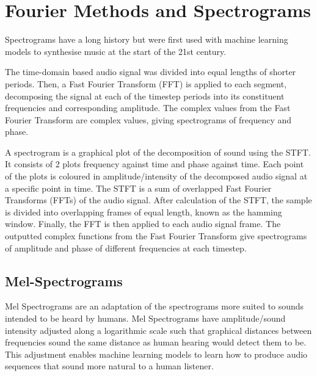 \section{Fourier Methods and Spectrograms}
\label{sec:fourier_methods_and_spectrograms}

Spectrograms have a long history but were first used with machine learning models to synthesise music at the start of the 21st century\cite{NoteOnsetDetection}.

The time-domain based audio signal was divided into equal lengths of shorter periods. Then, a Fast Fourier Transform (FFT) is applied to each segment, decomposing the signal at each of the timestep periods into its constituent frequencies and corresponding amplitude. The complex values from the Fast Fourier Transform are complex values, giving spectrograms of frequency and phase.

A spectrogram is a graphical plot of the decomposition of sound using the \acrfull{STFT}. It consists of 2 plots frequency against time and phase against time. Each point of the plots is coloured in amplitude/intensity of the decomposed audio signal at a specific point in time. The STFT is a sum of overlapped Fast Fourier Transforms (FFTs) of the audio signal. After calculation of the STFT, the sample is divided into overlapping frames of equal length, known as the hamming window. Finally, the FFT is then applied to each audio signal frame. The outputted complex functions from the Fast Fourier Transform give spectrograms of amplitude and phase of different frequencies at each timestep.

\subsection{Mel-Spectrograms}

Mel Spectrograms are an adaptation of the spectrograms more suited to sounds intended to be heard by humans. Mel Spectrograms have amplitude/sound intensity adjusted along a logarithmic scale such that graphical distances between frequencies sound the same distance as human hearing would detect them to be. This adjustment enables machine learning models to learn how to produce audio sequences that sound more natural to a human listener.

